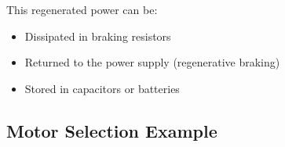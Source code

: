 This regenerated power can be:
\begin{itemize}
    \item Dissipated in braking resistors
    \item Returned to the power supply (regenerative braking)
    \item Stored in capacitors or batteries
\end{itemize}

\subsection{Motor Selection Example}
\label{subsec:motor_selection}

